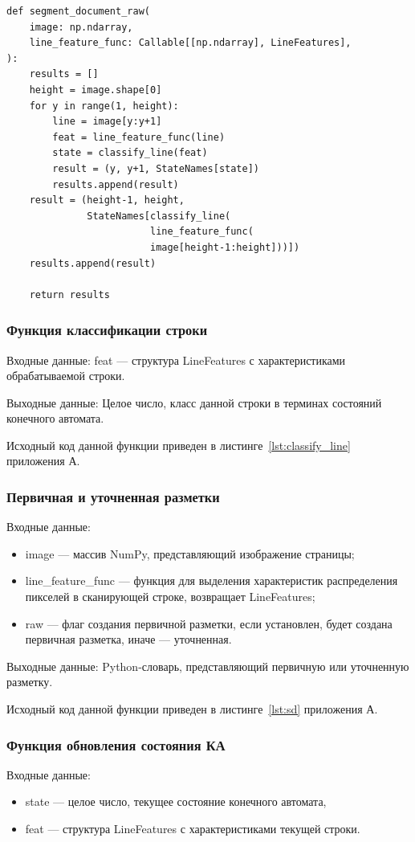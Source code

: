 \begin{lstlisting}[caption={Функия создания построчной разметки (используется для отладки)}, label={}]
def segment_document_raw(
    image: np.ndarray,
    line_feature_func: Callable[[np.ndarray], LineFeatures],
):
    results = []
    height = image.shape[0]
    for y in range(1, height):
        line = image[y:y+1]
        feat = line_feature_func(line)
        state = classify_line(feat)
        result = (y, y+1, StateNames[state])
        results.append(result)
    result = (height-1, height,
              StateNames[classify_line(
                         line_feature_func(
                         image[height-1:height]))])
    results.append(result)

    return results
\end{lstlisting}

\subsubsection{Функция классификации строки} %
Входные данные: feat --- структура LineFeatures с характеристиками обрабатываемой строки.

Выходные данные: Целое число, класс данной строки в терминах состояний конечного автомата.

Исходный код данной функции приведен в листинге~\ref{lst:classify_line} приложения А.

\subsubsection{Первичная и уточненная разметки} %
Входные данные:
\begin{itemize}
    \item image --- массив NumPy, представляющий изображение страницы;
    \item line\_feature\_func --- функция для выделения характеристик распределения пикселей в сканирующей строке, возвращает LineFeatures;
    \item raw --- флаг создания первичной разметки, если установлен, будет создана первичная разметка, иначе --- уточненная.
\end{itemize}

Выходные данные: Python-словарь, представляющий первичную или уточненную разметку.

Исходный код данной функции приведен в листинге~\ref{lst:sd} приложения А.

\subsubsection{Функция обновления состояния КА} %
Входные данные:
\begin{itemize}
    \item state --- целое число, текущее состояние конечного автомата,
    \item feat --- структура LineFeatures с характеристиками текущей строки.
\end{itemize}

